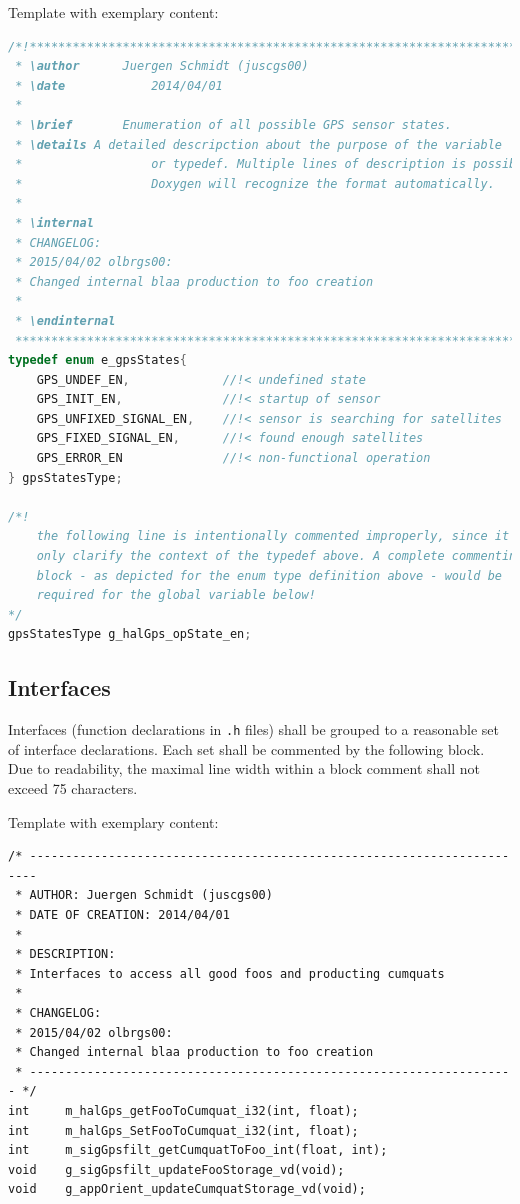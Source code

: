 Template with exemplary content:
\begin{lstlisting}[language=C]
/*!**********************************************************************
 * \author 		Juergen Schmidt (juscgs00)
 * \date 			2014/04/01
 * 
 * \brief		Enumeration of all possible GPS sensor states.
 * \details	A detailed descripction about the purpose of the variable 
 *					or typedef. Multiple lines of description is possible. 
 * 					Doxygen will recognize the format automatically.
 * 
 * \internal
 * CHANGELOG:
 * 2015/04/02 olbrgs00:
 * Changed internal blaa production to foo creation
 *
 * \endinternal
 ***********************************************************************/
typedef enum e_gpsStates{
	GPS_UNDEF_EN,             //!< undefined state   
	GPS_INIT_EN,              //!< startup of sensor
	GPS_UNFIXED_SIGNAL_EN,    //!< sensor is searching for satellites
	GPS_FIXED_SIGNAL_EN,      //!< found enough satellites
	GPS_ERROR_EN              //!< non-functional operation
} gpsStatesType;

/*!
	the following line is intentionally commented improperly, since it shall
	only clarify the context of the typedef above. A complete commenting
	block - as depicted for the enum type definition above - would be 
	required for the global variable below!
*/
gpsStatesType g_halGps_opState_en; 
\end{lstlisting}

\newpage
\subsection{Interfaces}
\label{sec:style:comments:functions}
Interfaces (function declarations in \texttt{.h} files) shall be grouped to a reasonable set of interface declarations. Each set shall be commented by the following block. Due to readability, the maximal line width within a block comment shall not exceed 75 characters.

Template with exemplary content:
\begin{lstlisting}
/* -----------------------------------------------------------------------
 * AUTHOR: Juergen Schmidt (juscgs00)
 * DATE OF CREATION: 2014/04/01
 *
 * DESCRIPTION:
 * Interfaces to access all good foos and producting cumquats
 * 
 * CHANGELOG:
 * 2015/04/02 olbrgs00:
 * Changed internal blaa production to foo creation
 * -------------------------------------------------------------------- */
int 	m_halGps_getFooToCumquat_i32(int, float);
int 	m_halGps_SetFooToCumquat_i32(int, float);
int 	m_sigGpsfilt_getCumquatToFoo_int(float, int);
void 	g_sigGpsfilt_updateFooStorage_vd(void);
void 	g_appOrient_updateCumquatStorage_vd(void);
\end{lstlisting}

